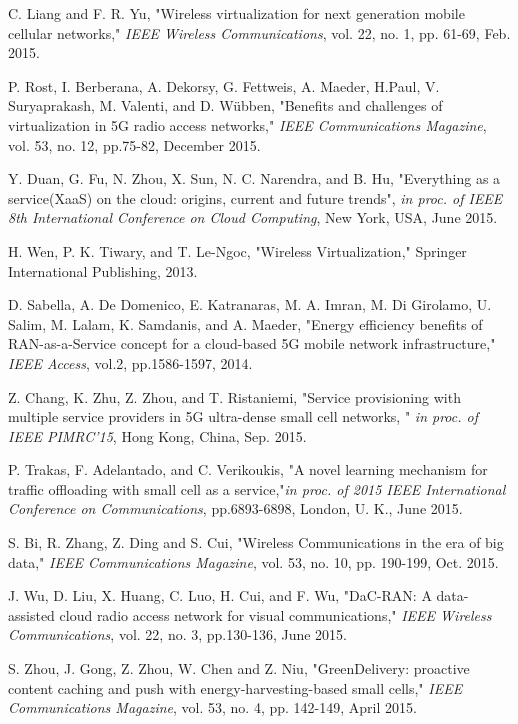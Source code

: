 \documentclass[12pt,draftclsnofoot,onecolumn]{IEEEtran}
\begin{document}
\begin{thebibliography}{1}


C. Liang and F. R. Yu, "Wireless virtualization for next
generation mobile cellular networks," \emph{IEEE Wireless
Communications}, vol. 22, no. 1, pp. 61-69, Feb. 2015.

P. Rost, I. Berberana, A. Dekorsy, G. Fettweis, A. Maeder, H.Paul,
V. Suryaprakash, M. Valenti, and D. W\"ubben, "Benefits and
challenges of virtualization in 5G radio access networks,"
\emph{IEEE Communications Magazine},  vol. 53, no. 12, pp.75-82, December 2015.


Y. Duan, G. Fu, N. Zhou, X. Sun, N. C. Narendra, and B. Hu,
"Everything as a service(XaaS) on the cloud: origins, current and
future trends", \emph{in proc. of IEEE 8th International
Conference on Cloud Computing}, New York, USA, June 2015.

H. Wen, P. K. Tiwary, and T. Le-Ngoc, "Wireless Virtualization," Springer International Publishing,
2013.




D. Sabella, A. De Domenico, E. Katranaras, M. A. Imran, M. Di
Girolamo, U. Salim, M. Lalam, K. Samdanis, and A. Maeder, "Energy
efficiency benefits of RAN-as-a-Service concept for a cloud-based
5G mobile network infrastructure," \emph{IEEE Access}, vol.2,
pp.1586-1597, 2014.


Z. Chang, K. Zhu, Z. Zhou, and T. Ristaniemi, "Service
provisioning with multiple service providers in 5G ultra-dense
small cell networks, " \emph{in proc. of IEEE PIMRC'15}, Hong
Kong, China, Sep. 2015.

P. Trakas, F. Adelantado, and C. Verikoukis, "A novel learning
mechanism for traffic offloading with small cell as a
service,"\emph{in proc. of 2015 IEEE International Conference on
Communications}, pp.6893-6898, London, U. K., June 2015.


S. Bi, R. Zhang, Z. Ding and S. Cui, "Wireless Communications in
the era of big data," \emph{IEEE Communications Magazine}, vol.
53, no. 10, pp. 190-199, Oct. 2015.

J. Wu, D. Liu, X. Huang, C. Luo, H. Cui, and F. Wu, "DaC-RAN: A
data-assisted cloud radio access network for visual
communications," \emph{IEEE Wireless Communications}, vol. 22, no.
3, pp.130-136, June 2015.


S. Zhou, J. Gong, Z. Zhou, W. Chen and Z. Niu, "GreenDelivery: proactive content caching and push with energy-harvesting-based small cells," \emph{IEEE Communications Magazine}, vol. 53, no. 4, pp. 142-149, April 2015.



\end{thebibliography}
\end{document}
